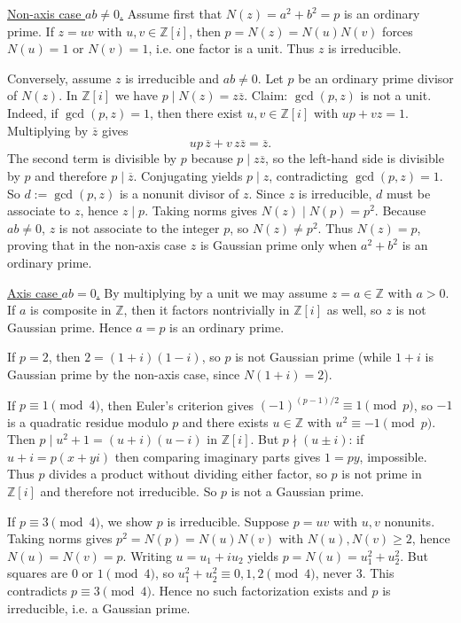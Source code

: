 \smallskip
\noindent\underline{Non-axis case $ab\ne0$.}
Assume first that $N(z)=a^2+b^2=p$ is an ordinary prime.
If $z=uv$ with $u,v\in\mathbb Z[i]$, then $p=N(z)=N(u)N(v)$ forces $N(u)=1$ or $N(v)=1$, i.e. one factor is a unit.
Thus $z$ is irreducible.

Conversely, assume $z$ is irreducible and $ab\ne0$.
Let $p$ be an ordinary prime divisor of $N(z)$.
In $\mathbb Z[i]$ we have $p\mid N(z)=z\overline z$.
Claim: $\gcd(p,z)$ is not a unit.
Indeed, if $\gcd(p,z)=1$, then there exist $u,v\in\mathbb Z[i]$ with $up+vz=1$.
Multiplying by $\overline z$ gives
\[
up\,\overline z + v\,z\overline z = \overline z.
\]
The second term is divisible by $p$ because $p\mid z\overline z$, so the left-hand side is divisible by $p$ and therefore $p\mid\overline z$.
Conjugating yields $p\mid z$, contradicting $\gcd(p,z)=1$.
So $d:=\gcd(p,z)$ is a nonunit divisor of $z$.
Since $z$ is irreducible, $d$ must be associate to $z$, hence $z\mid p$.
Taking norms gives $N(z)\mid N(p)=p^2$.
Because $ab\ne0$, $z$ is not associate to the integer $p$, so $N(z)\ne p^2$.
Thus $N(z)=p$, proving that in the non-axis case $z$ is Gaussian prime only when $a^2+b^2$ is an ordinary prime.

\smallskip
\noindent\underline{Axis case $ab=0$.}
By multiplying by a unit we may assume $z=a\in\mathbb Z$ with $a>0$.
If $a$ is composite in $\mathbb Z$, then it factors nontrivially in $\mathbb Z[i]$ as well, so $z$ is not Gaussian prime.
Hence $a=p$ is an ordinary prime.

If $p=2$, then $2=(1+i)(1-i)$, so $p$ is not Gaussian prime (while $1+i$ is Gaussian prime by the non-axis case, since $N(1+i)=2$).

If $p\equiv1\pmod4$, then Euler's criterion gives $(-1)^{(p-1)/2}\equiv 1\pmod p$, so $-1$ is a quadratic residue modulo $p$ and there exists $u\in\mathbb Z$ with $u^2\equiv-1\pmod p$.
Then $p\mid u^2+1=(u+i)(u-i)$ in $\mathbb Z[i]$.
But $p\nmid (u\pm i)$: if $u+i=p(x+yi)$ then comparing imaginary parts gives $1=py$, impossible.
Thus $p$ divides a product without dividing either factor, so $p$ is not prime in $\mathbb Z[i]$ and therefore not irreducible.
So $p$ is not a Gaussian prime.

If $p\equiv3\pmod4$, we show $p$ is irreducible.
Suppose $p=uv$ with $u,v$ nonunits.
Taking norms gives $p^2=N(p)=N(u)N(v)$ with $N(u),N(v)\ge2$, hence $N(u)=N(v)=p$.
Writing $u=u_1+iu_2$ yields $p=N(u)=u_1^2+u_2^2$.
But squares are $0$ or $1\pmod4$, so $u_1^2+u_2^2\equiv0,1,2\pmod4$, never $3$.
This contradicts $p\equiv3\pmod4$.
Hence no such factorization exists and $p$ is irreducible, i.e. a Gaussian prime.

